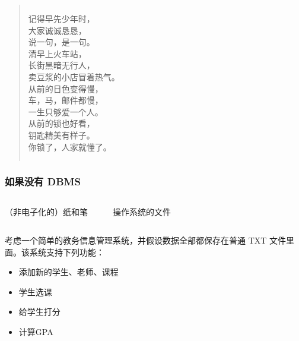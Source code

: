 \documentclass[aspectratio=169, 14pt]{beamer}
\begin{document}
\begin{frame}[fragile]
\begin{quote}
    \begin{columns}
        记得早先少年时，\\
        大家诚诚恳恳，\\
        说一句，是一句。\\
        \bigskip
        清早上火车站，\\
        长街黑暗无行人，\\
        卖豆浆的小店冒着热气。\\
        从前的日色变得慢，\\
\alert{车，马，邮件都慢}，\\
一生只够爱一个人。\\
\bigskip
从前的锁也好看，\\
钥匙精美有样子。\\
你锁了，人家就懂了。\\
    \end{columns}
\end{quote}
\end{frame}

\begin{frame}
    \frametitle{如果没有 DBMS}

    \begin{columns}
        {\Large {}}  {\huge {}}

        （非电子化的）纸和笔

        {\LARGE {}      } 

        操作系统的文件
    \end{columns}
\end{frame}
\begin{frame}
    考虑一个简单的\alert{教务信息管理系统}，并假设数据全部都保存在普通 TXT 文件里面。该系统支持下列功能：
\begin{itemize}
    \item 添加新的学生、老师、课程
    \item 学生选课
    \item 给学生打分
    \item 计算GPA
\end{itemize}
\end{frame}
\end{document}
